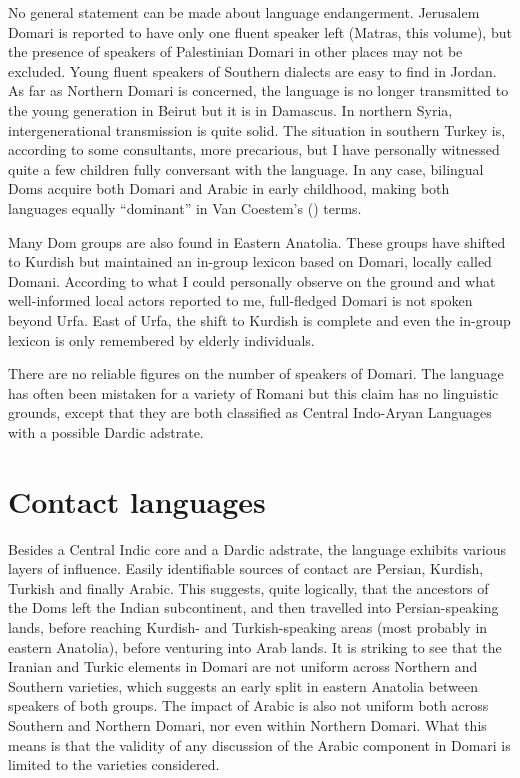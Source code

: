\documentclass[output=paper]{langsci/langscibook}
\begin{document}
No general statement can be made about language endangerment. Jerusalem Domari is reported to have only one fluent speaker left (Matras, this volume), but the presence of speakers of Palestinian Domari in other places may not be excluded. Young fluent speakers of Southern dialects are easy to find in Jordan. As far as Northern Domari is concerned, the language is no longer transmitted to the young generation in Beirut but it is in Damascus. In northern Syria, intergenerational transmission is quite solid. The situation in southern Turkey is, according to some consultants, more precarious, but I have personally witnessed quite a few children fully conversant with the language. In any case, bilingual Doms acquire both Domari and Arabic in early childhood, making both languages equally “dominant” in Van Coestem’s (\citeyear{VanCoetsem1988,VanCoetsem2000}) terms.

Many Dom groups are also found in Eastern Anatolia. These groups have shifted to Kurdish but maintained an in-group lexicon based on Domari, locally called Domani. According to what I could personally observe on the ground and what well-informed local actors reported to me, full-fledged Domari is not spoken beyond Urfa. East of Urfa, the shift to Kurdish is complete and even the in-group lexicon is only remembered by elderly individuals. 

There are no reliable figures on the number of speakers of Domari. The language has often been mistaken for a variety of Romani but this claim has no linguistic grounds, except that they are both classified as Central Indo-Aryan Languages with a possible Dardic adstrate.
\largerpage
\section{Contact languages}

Besides a Central Indic core and a Dardic adstrate, the language exhibits various layers of influence. Easily identifiable sources of contact are Persian, Kurdish, Turkish and finally Arabic. This suggests, quite logically, that the ancestors of the Doms left the Indian subcontinent, and then travelled into Persian-speaking lands, before reaching Kurdish- and Turkish-speaking areas (most probably in eastern Anatolia), before venturing into Arab lands. It is striking to see that the Iranian and Turkic elements in Domari are not uniform across Northern and Southern varieties, which suggests an early split in eastern Anatolia between speakers of both groups. The impact of Arabic is also not uniform both across Southern and Northern Domari, nor even within Northern Domari. What this means is that the validity of any discussion of the Arabic component in Domari is limited to the varieties considered.
\end{document}
